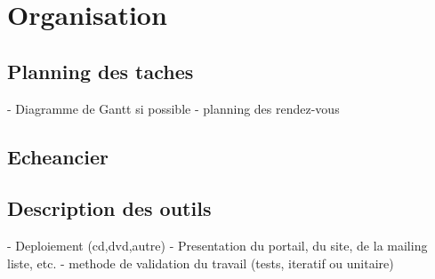\chapter{Organisation}



\section{Planning des taches}

- Diagramme de Gantt si possible
- planning des rendez-vous


\section{Echeancier}


\section{Description des outils}

- Deploiement (cd,dvd,autre)
- Presentation du portail, du site, de la mailing liste, etc.
- methode de validation du travail (tests, iteratif ou unitaire)




